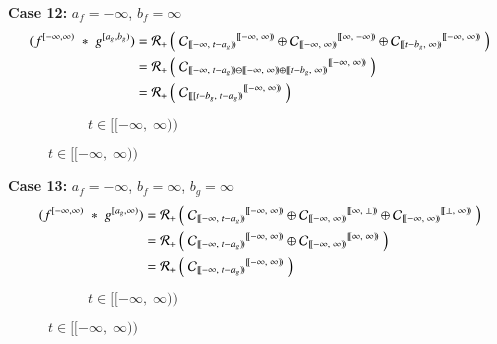 \textbf{Case 12:} $a_f=-\infty$, $b_f=\infty$
\begin{align*}
	(f^{[-\infty,\infty)} \;*\; g^{[a_g,b_g)})
	= \R[+] &\left( \; 
			{\C[ [\![-\infty,\;t-a_g)\!) ]}^{[\![-\infty,\;\infty)\!)} \oplus
			{\C[ [\![-\infty,\;\infty)\!) ]}^{[\![\infty,\; -\infty)\!)} \oplus
			{\C[ [\![t-b_g,\;\infty)\!) ]}^{[\![-\infty,\; \infty)\!)} 
		\; \right) \\
	= \R[+] &\left( \; 
			{\C[ [\![-\infty,\;t-a_g)\!)\ominus[\![-\infty,\;\infty)\!)\oplus[\![t-b_g,\;\infty)\!) ]}^{[\![-\infty,\;\infty)\!)}
		\; \right) \\
	= \R[+] &\left( \; 
			{\C[ [\![[t-b_g,\;t-a_g)\!) ]}^{[\![-\infty,\;\infty)\!)}
		\; \right) \\
\end{align*}
\vspace{-3cm}
\begin{figure}[h]
	\centering
	\begin{subfigure}[h]{0.4\textwidth}
		\caption{$t \in [\![-\infty, \; \infty)\!)$} 
		\centering
	\end{subfigure}
\end{figure}



\textbf{Case 13:} $a_f=-\infty$, $b_f=\infty$, $b_g=\infty$
\begin{align*}
	(f^{[-\infty,\infty)} \;*\; g^{[a_g,\infty)})
	= \R[+] &\left( \; 
			{\C[ [\![-\infty,\;t-a_g)\!) ]}^{[\![-\infty,\; \infty)\!)} \oplus
			{\C[ [\![-\infty,\;\infty)\!) ]}^{[\![\infty,\; \bot)\!)} \oplus
			{\C[ [\![-\infty,\;\infty)\!) ]}^{[\![\bot,\; \infty)\!)} 
		\; \right) \\
	= \R[+] &\left( \; 
			{\C[ [\![-\infty,\;t-a_g)\!) ]}^{[\![-\infty,\; \infty)\!)} \oplus
			{\C[ [\![-\infty,\;\infty)\!) ]}^{[\![\infty,\; \infty)\!)} 
		\; \right) \\
	= \R[+] &\left( \; 
			{\C[ [\![-\infty,\;t-a_g)\!) ]}^{[\![-\infty,\; \infty)\!)}
		\; \right)
\end{align*}
\vspace{-1.5cm}
\begin{figure}[h]
	\centering
	\begin{subfigure}[h]{0.4\textwidth}
		\caption{$t \in [\![-\infty, \; \infty)\!)$} 
		\centering
	\end{subfigure}
\end{figure}


